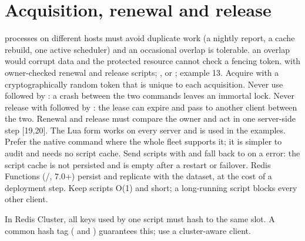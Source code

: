 \section{Acquisition, renewal and release}
{processes on different hosts must avoid duplicate work (a nightly report, a cache rebuild, one active scheduler) and an occasional overlap is tolerable.}
{an overlap would corrupt data and the protected resource cannot check a fencing token.}
{ with owner-checked renewal and release scripts; ,  or ; example 13.}
Acquire with a cryptographically random token that is unique to each acquisition. Never use  followed by : a crash between the two commands leaves an immortal lock. Never release with  followed by : the lease can expire and pass to another client between the two. Renewal and release must compare the owner and act in one server-side step [19,20].
The Lua form works on every server and is used in the examples. Prefer the native command where the whole fleet supports it; it is simpler to audit and needs no script cache. Send scripts with  and fall back to  on a  error: the script cache is not persisted and is empty after a restart or failover. Redis Functions (/, 7.0+) persist and replicate with the dataset, at the cost of a deployment step. Keep scripts O(1) and short; a long-running script blocks every other client.

In Redis Cluster, all keys used by one script must hash to the same slot. A common hash tag ( and ) guarantees this; use a cluster-aware client.


